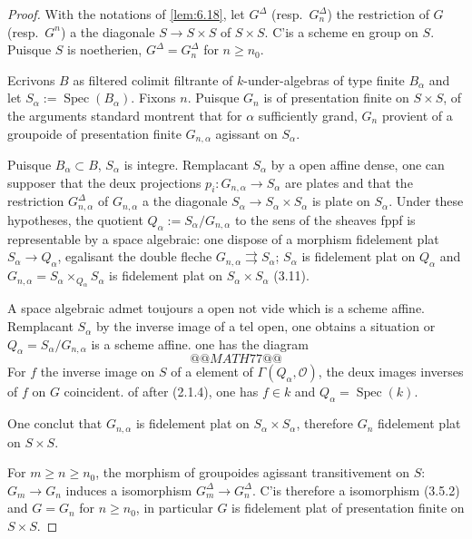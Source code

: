 \documentclass[12pt,a4paper]{article}
\theoremstyle{plain}
\theoremstyle{definition}
\theoremstyle{remark}
\DeclareMathOperator{\Spec}{Spec}
\begin{document}
\begin{proof}
With the notations of \ref{lem:6.18}, let $G^\Delta$ (resp.~$G_n^\Delta$) the restriction of $G$ (resp.~$G^n$) a the diagonale $S \to S \times S$ of $S \times S$. C'is a scheme en group on $S$. Puisque $S$ is noetherien, $G^\Delta = G_n^\Delta$ for $n \geq n_0$.

Ecrivons $B$ as filtered colimit filtrante of $k$-under-algebras of type finite $B_\alpha$ and let $S_\alpha := \Spec(B_\alpha)$. Fixons $n$. Puisque $G_n$ is of presentation finite on $S \times S$, of the arguments standard montrent that for $\alpha$ sufficiently grand, $G_n$ provient of a groupoide of presentation finite $G_{n,\alpha}$ agissant on $S_\alpha$.

Puisque $B_\alpha \subset B$, $S_\alpha$ is integre. Remplacant $S_\alpha$ by a open affine dense, one can supposer that the deux projections $p_i : G_{n,\alpha} \to S_\alpha$ are plates and that the restriction $G_{n,\alpha}^\Delta$ of $G_{n,\alpha}$ a the diagonale $S_\alpha \to S_\alpha \times S_\alpha$ is plate on $S_\alpha$. Under these hypotheses, the quotient $Q_\alpha := S_\alpha / G_{n,\alpha}$ to the sens of the sheaves fppf is representable by a space algebraic: one dispose of a morphism fidelement plat $S_\alpha \to Q_\alpha$, egalisant the double fleche $G_{n,\alpha} \rightrightarrows S_\alpha$; $S_\alpha$ is fidelement plat on $Q_\alpha$ and $G_{n,\alpha} = S_\alpha \times_{Q_\alpha} S_\alpha$ is fidelement plat on $S_\alpha \times S_\alpha$ (3.11).

A space algebraic admet toujours a open not vide which is a scheme affine. Remplacant $S_\alpha$ by the inverse image of a tel open, one obtains a situation or $Q_\alpha = S_\alpha / G_{n,\alpha}$ is a scheme affine. one has the diagram
\[
@@MATH77@@
\]
For $f$ the inverse image on $S$ of a element of $\Gamma(Q_\alpha, \mathcal{O})$, the deux images inverses of $f$ on $G$ coincident. of after (2.1.4), one has $f \in k$ and $Q_\alpha = \Spec(k)$.

One conclut that $G_{n,\alpha}$ is fidelement plat on $S_\alpha \times S_\alpha$, therefore $G_n$ fidelement plat on $S \times S$.

For $m \geq n \geq n_0$, the morphism of groupoides agissant transitivement on $S$: $G_m \to G_n$ induces a isomorphism $G_m^\Delta \to G_n^\Delta$. C'is therefore a isomorphism (3.5.2) and $G = G_n$ for $n \geq n_0$, in particular $G$ is fidelement plat of presentation finite on $S \times S$.
\end{proof}
\end{document}
